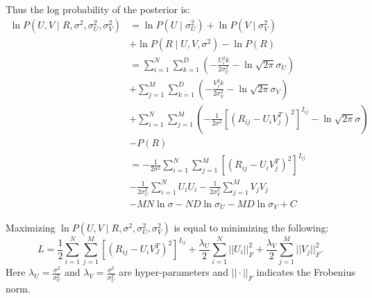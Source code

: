 \documentclass{article}
\begin{document}
Thus the log probability of the posterior is:
\begin{align}
    \ln P(U, V \mid R, \sigma^2, \sigma_U^2, \sigma_V^2) & = \ln P(U \mid \sigma_U^2) + \ln P(V \mid \sigma_V^2)                                                               \\
                                                         & + \ln P(R \mid U,V, \sigma^2) - \ln P(R) \nonumber                                                                  \\
                                                         & = \sum_{i=1}^N \sum_{k=1}^D (- \frac{U_i^2k}{2 \sigma_U^2} - \ln \sqrt{2\pi} \sigma_U)                              \\
                                                         & + \sum_{j=1}^M \sum_{k=1}^D (- \frac{V_j^2k}{2 \sigma_V^2} - \ln \sqrt{2\pi} \sigma_V) \nonumber                    \\
                                                         & + \sum_{i=1}^N \sum_{j=1}^M (- \frac{1}{2\sigma^2}[(R_{ij}-U_iV_j^T)^2]^{I_{ij}} - \ln \sqrt{2\pi}\sigma) \nonumber \\
                                                         & - P(R) \nonumber                                                                                                    \\
                                                         & = -\frac{1}{2\sigma^2} \sum_{i=1}^N \sum_{j=1}^M [(R_{ij} - U_iV_j^T)^2]^{I_{ij}}                                   \\
                                                         & - \frac{1}{2\sigma_U^2} \sum_{i=1}^N U_iU_i - \frac{1}{2 \sigma_V^2} \sum_{j=1}^M V_jV_j \nonumber                  \\
                                                         & - MN \ln \sigma - ND \ln \sigma_U - MD \ln \sigma_V + C \nonumber
\end{align}


Maximizing $\ln P(U, V \mid R, \sigma^2, \sigma_U^2, \sigma_V^2)$ is equal to minimizing the following:
\begin{equation}
    L = \frac{1}{2} \sum_{i=1}^N \sum_{j=1}^M [(R_{ij}-U_iV_J^T)^2]^{I_{ij}}
    + \frac{\lambda_U}{2} \sum_{i=1}^N||U_i||_{F}^2
    + \frac{\lambda_V}{2} \sum_{j=1}^M||V_j||_{F}^2.
\end{equation}
Here $\lambda_U = \frac{\sigma^2}{\sigma_U^2}$ and $\lambda_V = \frac{\sigma^2}{\sigma_U^2}{}$ are hyper-parameters and $||\cdot||_{F}$ indicates the Frobenius norm.
\end{document}
